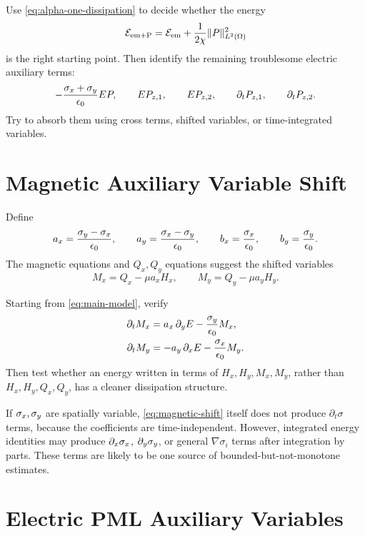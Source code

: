 \documentclass[UTF8,a4paper,12pt]{ctexart}
\begin{document}
\begin{task}[Use the alpha=1 identity]
Use \eqref{eq:alpha-one-dissipation} to decide whether the energy
\[
  \mathcal{E}_{\rm em+P}
  =\mathcal{E}_{\rm em}+\frac{1}{2\chi}\|P\|_{L^2(\Omega)}^2
\]
is the right starting point.  Then identify the remaining troublesome electric auxiliary terms:
\[
  -\frac{\sigma_x+\sigma_y}{\epsilon_0}EP,\qquad
  E P_{z,1},\qquad
  E P_{z,2},\qquad
  \partial_tP_{z,1},\qquad
  \partial_tP_{z,2}.
\]
Try to absorb them using cross terms, shifted variables, or time-integrated variables.
\end{task}

\section{Magnetic Auxiliary Variable Shift}

Define
\[
  a_x=\frac{\sigma_y-\sigma_x}{\epsilon_0},\qquad
  a_y=\frac{\sigma_x-\sigma_y}{\epsilon_0},\qquad
  b_x=\frac{\sigma_x}{\epsilon_0},\qquad
  b_y=\frac{\sigma_y}{\epsilon_0}.
\]
The magnetic equations and \(Q_x,Q_y\) equations suggest the shifted variables
\[
  M_x=Q_x-\mu a_xH_x,\qquad
  M_y=Q_y-\mu a_yH_y.
\]

\begin{task}
Starting from \eqref{eq:main-model}, verify
\begin{equation}
\begin{aligned}
\partial_tM_x
&= a_x\,\partial_yE-\frac{\sigma_y}{\epsilon_0}M_x,\\
\partial_tM_y
&= -a_y\,\partial_xE-\frac{\sigma_x}{\epsilon_0}M_y.
\end{aligned}
\label{eq:magnetic-shift}
\end{equation}
Then test whether an energy written in terms of \(H_x,H_y,M_x,M_y\), rather than \(H_x,H_y,Q_x,Q_y\), has a cleaner dissipation structure.
\end{task}

\begin{remark}
If \(\sigma_x,\sigma_y\) are spatially variable, \eqref{eq:magnetic-shift} itself does not produce \(\partial_t\sigma\) terms, because the coefficients are time-independent.  However, integrated energy identities may produce \(\partial_x\sigma_x\), \(\partial_y\sigma_y\), or general \(\nabla\sigma_i\) terms after integration by parts.  These terms are likely to be one source of bounded-but-not-monotone estimates.
\end{remark}

\section{Electric PML Auxiliary Variables}
\end{document}
